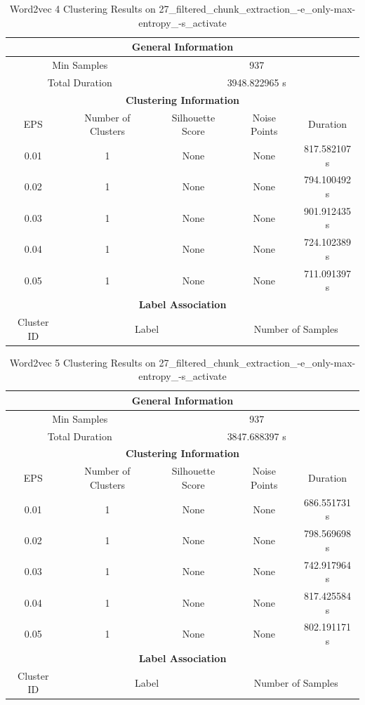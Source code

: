 \begin{longtable}{|c|c|c|c|c|}
\caption{Word2vec 4 Clustering Results on 27\_filtered\_chunk\_extraction\_-e\_only-max-entropy\_-s\_activate} \label{tab:27_filtered_chunk_extraction_-e_only-max-entropy_-s_activate_word2vec_4_clustering_results}\\
\hline
\multicolumn{5}{|c|}{\textbf{General Information}} \\
\hline
\multicolumn{2}{|c|}{Min Samples} & \multicolumn{3}{c|}{937} \\
\multicolumn{2}{|c|}{Total Duration} & \multicolumn{3}{c|}{3948.822965 s} \\
\hline
\multicolumn{5}{|c|}{\textbf{Clustering Information}} \\
\hline
EPS & Number of Clusters & Silhouette Score & Noise Points & Duration \\
0.01 & 1 & None & None & 817.582107 s\\
0.02 & 1 & None & None & 794.100492 s\\
0.03 & 1 & None & None & 901.912435 s\\
0.04 & 1 & None & None & 724.102389 s\\
0.05 & 1 & None & None & 711.091397 s\\
\hline
\multicolumn{5}{|c|}{\textbf{Label Association}} \\
\hline
Cluster ID & \multicolumn{2}{c|}{Label} & \multicolumn{2}{c|}{Number of Samples} \\
\hline
\end{longtable}


\begin{longtable}{|c|c|c|c|c|}
\caption{Word2vec 5 Clustering Results on 27\_filtered\_chunk\_extraction\_-e\_only-max-entropy\_-s\_activate} \label{tab:27_filtered_chunk_extraction_-e_only-max-entropy_-s_activate_word2vec_5_clustering_results}\\
\hline
\multicolumn{5}{|c|}{\textbf{General Information}} \\
\hline
\multicolumn{2}{|c|}{Min Samples} & \multicolumn{3}{c|}{937} \\
\multicolumn{2}{|c|}{Total Duration} & \multicolumn{3}{c|}{3847.688397 s} \\
\hline
\multicolumn{5}{|c|}{\textbf{Clustering Information}} \\
\hline
EPS & Number of Clusters & Silhouette Score & Noise Points & Duration \\
0.01 & 1 & None & None & 686.551731 s\\
0.02 & 1 & None & None & 798.569698 s\\
0.03 & 1 & None & None & 742.917964 s\\
0.04 & 1 & None & None & 817.425584 s\\
0.05 & 1 & None & None & 802.191171 s\\
\hline
\multicolumn{5}{|c|}{\textbf{Label Association}} \\
\hline
Cluster ID & \multicolumn{2}{c|}{Label} & \multicolumn{2}{c|}{Number of Samples} \\
\hline
\end{longtable}


